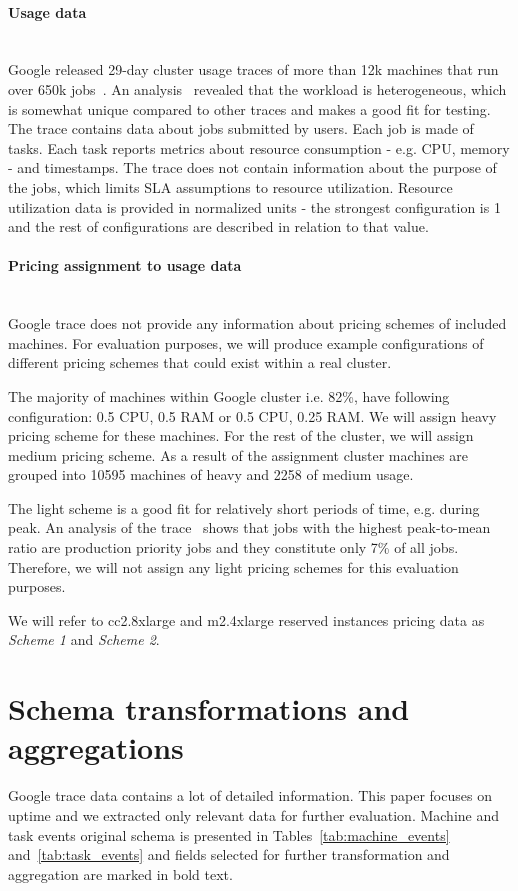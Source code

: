 \documentclass[]{final_report}
\newcommand{\myparagraph}[1]{\paragraph{#1}\mbox{}\\}
\begin{document}
\myparagraph{Usage data}

Google released 29-day cluster usage traces of more than 12k machines that run over 650k jobs~\cite{clusterdata:Reiss2011}. An analysis~\cite{clusterdata:Reiss2012b} revealed that the workload is heterogeneous, which is somewhat unique compared to other traces and makes a good fit for testing.
The trace contains data about jobs submitted by users. Each job is made of tasks. Each task reports metrics about resource consumption - e.g. CPU, memory - and timestamps. The trace does not contain information about the purpose of the jobs, which limits SLA assumptions to resource utilization. 
Resource utilization data is provided in normalized units - the strongest configuration is 1 and the rest of configurations are described in relation to that value.

\myparagraph{Pricing assignment to usage data}

Google trace does not provide any information about pricing schemes of included machines. For evaluation purposes, we will produce example configurations of different pricing schemes that could exist within a real cluster. 

The majority of machines within Google cluster i.e. 82\%, have following configuration: 0.5 CPU, 0.5 RAM or 0.5 CPU, 0.25 RAM. We will assign heavy pricing scheme for these machines. For the rest of the cluster, we will assign medium pricing scheme. 
As a result of the assignment cluster machines are grouped into 10595 machines of heavy and 2258 of medium usage.

The light scheme is a good fit for relatively short periods of time, e.g. during peak. An analysis of the trace~\cite{clusterdata:Reiss2012b} shows that jobs with the highest peak-to-mean ratio are production priority jobs and they constitute only 7\% of all jobs. Therefore, we will not assign any light pricing schemes for this evaluation purposes. 

We will refer to cc2.8xlarge and m2.4xlarge reserved instances pricing data as \textit{Scheme 1} and \textit{Scheme 2}.  
 

\section{Schema transformations and aggregations}

Google trace data contains a lot of detailed information. This paper focuses on uptime and we extracted only relevant data for further evaluation. Machine and task events original schema is presented in Tables~\ref{tab:machine_events} and~\ref{tab:task_events} and fields selected for further transformation and aggregation are marked in bold text. 
\end{document}
